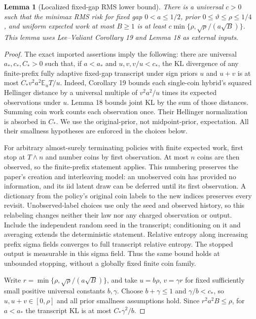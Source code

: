 \documentclass[11pt]{article}
\newtheorem{lemma}[theorem]{Lemma}
\newcommand{\E}{\mathbb E}
\begin{document}
\begin{lemma}[Localized fixed-gap RMS lower bound]\label{lem:fixedlower}
There is a universal $c>0$ such that the minimax RMS risk for fixed gap
$0<a\le1/2$, prior $0\le\vartheta\le\rho\le1/4$, and uniform expected
work at most $B\ge1$ is at least
$c\min\{\rho,\sqrt\rho/(a\sqrt B)\}$.
This lemma uses Lee--Valiant Corollary 19 and Lemma 18 as external inputs.
\end{lemma}
\begin{proof}
The exact imported assertions imply the following: there are universal
$a_*,c_*,C_*>0$ such that, if $a<a_*$ and $u,v,v/u<c_*$, the KL divergence
of any finite-prefix fully adaptive fixed-gap transcript under sign priors
$u$ and $u+v$ is at most $C_*v^2a^2\E_u T/u$.
Indeed, Corollary 19 bounds each single-coin hybrid's squared Hellinger
distance by a universal multiple of $v^2a^2/u$ times its expected observations
under $u$. Lemma 18 bounds joint KL by the sum of those distances. Summing
coin work counts each observation once. Their Hellinger normalization is
absorbed in $C_*$. We use the original-prior, not midpoint-prior, expectation.
All their smallness hypotheses are enforced in the choices below.

For arbitrary almost-surely terminating policies with finite expected work,
first stop at $T\wedge n$ and number coins by first observation. At most $n$
coins are then observed, so the finite-prefix statement applies. This numbering
preserves the paper's creation and interleaving model: an unobserved coin has
provided no information, and its iid latent draw can be deferred until its first
observation. A dictionary from the policy's original coin labels to the new
indices preserves every revisit. Unobserved-label choices use only the seed
and observed history, so this relabeling changes neither their law nor any
charged observation or output. Include the
independent random seed in the transcript; conditioning on it and averaging
extends the deterministic statement. Relative entropy along increasing prefix
sigma fields converges to full transcript relative entropy. The stopped output
is measurable in this sigma field. Thus the same bound holds at unbounded
stopping, without a globally fixed finite coin family.

Write $r=\min\{\rho,\sqrt\rho/(a\sqrt B)\}$, and take
$u=b\rho$, $v=\gamma r$ for fixed sufficiently small positive universal
constants $b,\gamma$. Choose $b+\gamma\le1$ and $\gamma/b<c_*$,
so $u,u+v\in[0,\rho]$ and all prior smallness assumptions hold.
Since $r^2a^2B\le\rho$, for $a<a_*$ the transcript KL is at most
$C_*\gamma^2/b$.


\end{proof}
\end{document}
